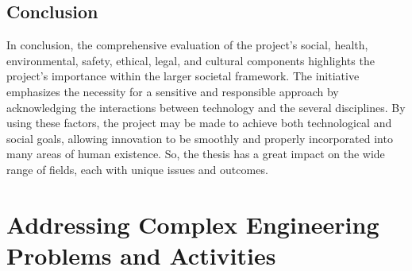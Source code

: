 \documentclass[a4paper,12pt,oneside]{book}
\begin{document}
\section{Conclusion}
In conclusion, the comprehensive evaluation of the project's social, health, environmental, safety, ethical, legal, and cultural components highlights the project's importance within the larger societal framework. The initiative emphasizes the necessity for a sensitive and responsible approach by acknowledging the interactions between technology and the several disciplines. By using these factors, the project may be made to achieve both technological and social goals, allowing innovation to be smoothly and properly incorporated into many areas of human existence. So, the thesis has a great impact on the wide range of fields, each with unique issues and outcomes.



\chapter{\textbf{Addressing Complex Engineering Problems and Activities}}\label{chap:prb and act}
\end{document}
